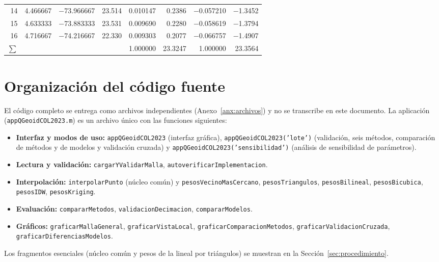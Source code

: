 \documentclass[11pt,letterpaper]{article}
\begin{document}
\begin{table}[H]
\begin{tabular}{@{}rrrrrrrr@{}}
14 & \num{4.466667} & \num{-73.966667} & \num{23.514} & \num{0.010147} & \num{0.2386} & \num{-0.057210} & \num{-1.3452} \\
15 & \num{4.633333} & \num{-73.883333} & \num{23.531} & \num{0.009690} & \num{0.2280} & \num{-0.058619} & \num{-1.3794} \\
16 & \num{4.716667} & \num{-74.216667} & \num{22.330} & \num{0.009303} & \num{0.2077} & \num{-0.066757} & \num{-1.4907} \\
\midrule
$\sum$ & & & & \num{1.000000} & \num{23.3247} & \num{1.000000} & \num{23.3564} \\
\bottomrule
\end{tabular}
\end{table}

\section{Organización del código fuente}
\label{anx:codigo}
El código completo se entrega como archivos independientes (Anexo~\ref{anx:archivos}) y no se transcribe
en este documento. La aplicación (\texttt{appQGeoidCOL2023.m}) es un archivo único con las funciones
siguientes:
\begin{itemize}
    \item \textbf{Interfaz y modos de uso:} \texttt{appQGeoidCOL2023} (interfaz gráfica),
    \texttt{appQGeoidCOL2023('lote')} (validación, seis métodos, comparación de métodos y de modelos y validación cruzada)
    y \texttt{appQGeoidCOL2023('sensibilidad')} (análisis de sensibilidad de parámetros).
    \item \textbf{Lectura y validación:} \texttt{cargarYValidarMalla}, \texttt{autoverificarImplementacion}.
    \item \textbf{Interpolación:} \texttt{interpolarPunto} (núcleo común) y \texttt{pesosVecinoMasCercano},
    \texttt{pesosTriangulos}, \texttt{pesosBilineal}, \texttt{pesosBicubica}, \texttt{pesosIDW}, \texttt{pesosKriging}.
    \item \textbf{Evaluación:} \texttt{compararMetodos}, \texttt{validacionDecimacion}, \texttt{compararModelos}.
    \item \textbf{Gráficos:} \texttt{graficarMallaGeneral}, \texttt{graficarVistaLocal},
    \texttt{graficarComparacionMetodos}, \texttt{graficarValidacionCruzada}, \texttt{graficarDiferenciasModelos}.
\end{itemize}
Los fragmentos esenciales (núcleo común y pesos de la lineal por triángulos) se muestran en la
Sección~\ref{sec:procedimiento}.
\end{document}
